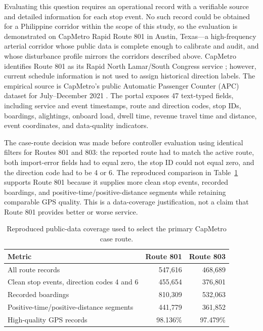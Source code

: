 Evaluating this question requires an operational record with a verifiable source and detailed information for each stop event. No such record could be obtained for a Philippine corridor within the scope of this study, so the evaluation is demonstrated on CapMetro Rapid Route 801 in Austin, Texas---a high-frequency arterial corridor whose public data is complete enough to calibrate and audit, and whose disturbance profile mirrors the corridors described above. CapMetro identifies Route 801 as its Rapid North Lamar/South Congress service \cite{CapMetroRapid}; however, current schedule information is not used to assign historical direction labels. The empirical source is CapMetro's public Automatic Passenger Counter (APC) dataset for July--December 2021 \cite{TexasCapMetroAPC2021}. The portal exposes 47 text-typed fields, including service and event timestamps, route and direction codes, stop IDs, boardings, alightings, onboard load, dwell time, revenue travel time and distance, event coordinates, and data-quality indicators.

The case-route decision was made before controller evaluation using identical filters for Routes 801 and 803: the reported route had to match the active route, both import-error fields had to equal zero, the stop ID could not equal zero, and the direction code had to be 4 or 6. The reproduced comparison in Table~\ref{tab:capmetro-route-selection} supports Route 801 because it supplies more clean stop events, recorded boardings, and positive-time/positive-distance segments while retaining comparable GPS quality. This is a data-coverage justification, not a claim that Route 801 provides better or worse service.

\begin{table}[htbp]
\centering
\caption{Reproduced public-data coverage used to select the primary CapMetro case route.}
\label{tab:capmetro-route-selection}
\small
\renewcommand{\arraystretch}{1.2}
\begin{tabularx}{\textwidth}{Xrr}
\toprule
\textbf{Metric} & \textbf{Route 801} & \textbf{Route 803} \\
\midrule
All route records & 547{,}616 & 468{,}689 \\
Clean stop events, direction codes 4 and 6 & 455{,}654 & 376{,}801 \\
Recorded boardings & 810{,}309 & 532{,}063 \\
Positive-time/positive-distance segments & 441{,}779 & 361{,}852 \\
High-quality GPS records & 98.136\% & 97.479\% \\
\bottomrule
\end{tabularx}
\end{table}

